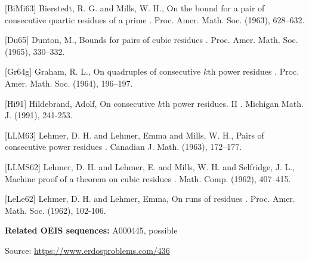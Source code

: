 \documentclass{article}
\begin{document}
[BiMi63] Bierstedt, R. G. and Mills, W. H., On the bound for a pair of consecutive quartic residues of a prime . Proc. Amer. Math. Soc. (1963), 628--632.

[Du65] Dunton, M., Bounds for pairs of cubic residues . Proc. Amer. Math. Soc. (1965), 330--332.

[Gr64g] Graham, R. L., On quadruples of consecutive {$k$}th power residues . Proc. Amer. Math. Soc. (1964), 196--197.

[Hi91] Hildebrand, Adolf, On consecutive {$k$}th power residues. II . Michigan Math. J. (1991), 241-253.

[LLM63] Lehmer, D. H. and Lehmer, Emma and Mills, W. H., Pairs of consecutive power residues . Canadian J. Math. (1963), 172--177.

[LLMS62] Lehmer, D. H. and Lehmer, E. and Mills, W. H. and Selfridge, J. L., Machine proof of a theorem on cubic residues . Math. Comp. (1962), 407--415.

[LeLe62] Lehmer, D. H. and Lehmer, Emma, On runs of residues . Proc. Amer. Math. Soc. (1962), 102-106.

\noindent\textbf{Related OEIS sequences:} A000445, possible


\bigskip
\noindent\small{Source: \url{https://www.erdosproblems.com/436}}
\end{document}
